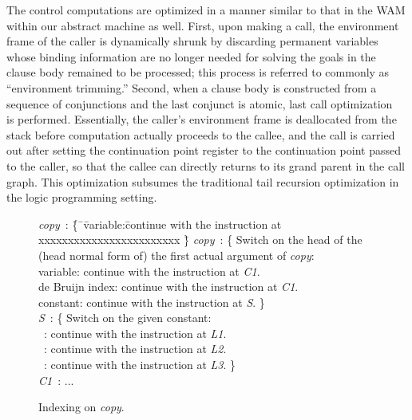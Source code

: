 The control computations are optimized in a manner similar to that
in the WAM within our abstract machine as well.
First, upon making a call, the environment frame of the caller is dynamically
shrunk by discarding permanent variables whose binding information are no
longer needed for solving the goals in the clause body remained to be
processed; this process is referred to commonly as ``environment trimming.''
Second, when a clause body is constructed from a sequence of conjunctions and
the last conjunct is atomic, last call optimization~\cite{Warren80} is
performed.
Essentially, the caller's environment frame is deallocated from the stack
before computation actually proceeds to the callee, and the call is carried
out after setting the continuation point register to the continuation
point passed to the caller, so that the callee can directly
returns to its grand parent in the call graph. This optimization
subsumes the traditional tail recursion optimization in the logic
programming setting.

\begin{figure}\footnotesize
\begin{tabbing}
\quad\= {\it copy}\ : \=\{\ \=\dquad\=variable:\dquad\dquad\= continue with the instruction at xxxxxxxxxxxxxxxxxxxxxxxx \=\}\kill
\>      {\it copy}\ : \>\{  \>Switch on the head of the (head normal form of) the first actual argument of {\it copy}: \\
\>                    \>    \>      \>variable:        \> continue with the instruction at {\it C1}.                   \\
\>                    \>    \>      \>de Bruijn index: \> continue with the instruction at {\it C1}.                   \\
\>                    \>    \>      \>constant:        \> continue with the instruction at {\it S}.       \>\}         \\
\>      {\it S}\ :    \>\{  \>Switch on the given constant:                                                            \\
\>                    \>    \>      \ :       \> continue with the instruction at {\it L1}.                   \\
\>                    \>    \>      \ :     \> continue with the instruction at {\it L2}.                   \\
\>                    \>    \>      \ :     \> continue with the instruction at {\it L3}.      \>\}         \\
\>      {\it C1}\ :   \>...
\end{tabbing}
\caption{Indexing on {\it copy}.}\label{fig:copy_index}
\end{figure}

